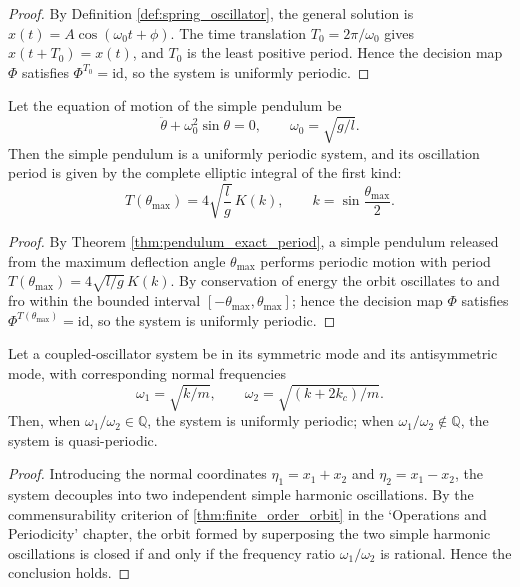 \begin{proof}
By Definition \ref{def:spring_oscillator}, the general solution is $x(t)=A\cos(\omega_0t+\phi)$. The time translation $T_0=2\pi/\omega_0$ gives $x(t+T_0)=x(t)$, and $T_0$ is the least positive period. Hence the decision map $\Phi$ satisfies $\Phi^{T_0}=\mathrm{id}$, so the system is uniformly periodic.
\end{proof}

\begin{lemma}\label{lem:pendulum_periodic}
Let the equation of motion of the simple pendulum be
\[
\ddot\theta+\omega_0^2\sin\theta=0,\qquad \omega_0=\sqrt{g/l}.
\]
Then the simple pendulum is a uniformly periodic system, and its oscillation period is given by the complete elliptic integral of the first kind:
\[
T(\theta_{\max})=4\sqrt{\frac{l}{g}}\,K(k),\qquad k=\sin\frac{\theta_{\max}}{2}.
\]
\end{lemma}

\begin{proof}
By Theorem \ref{thm:pendulum_exact_period}, a simple pendulum released from the maximum deflection angle $\theta_{\max}$ performs periodic motion with period $T(\theta_{\max})=4\sqrt{l/g}\,K(k)$. By conservation of energy the orbit oscillates to and fro within the bounded interval $[-\theta_{\max},\theta_{\max}]$; hence the decision map $\Phi$ satisfies $\Phi^{T(\theta_{\max})}=\mathrm{id}$, so the system is uniformly periodic.
\end{proof}

\begin{lemma}\label{lem:coupled_periodic}
Let a coupled-oscillator system be in its symmetric mode and its antisymmetric mode, with corresponding normal frequencies
\[
\omega_1=\sqrt{k/m},\qquad \omega_2=\sqrt{(k+2k_c)/m}.
\]
Then, when $\omega_1/\omega_2\in\mathbb Q$, the system is uniformly periodic; when $\omega_1/\omega_2\notin\mathbb Q$, the system is quasi-periodic.
\end{lemma}

\begin{proof}
Introducing the normal coordinates $\eta_1=x_1+x_2$ and $\eta_2=x_1-x_2$, the system decouples into two independent simple harmonic oscillations. By the commensurability criterion of \cref{thm:finite_order_orbit} in the `Operations and Periodicity' chapter, the orbit formed by superposing the two simple harmonic oscillations is closed if and only if the frequency ratio $\omega_1/\omega_2$ is rational. Hence the conclusion holds.
\end{proof}

